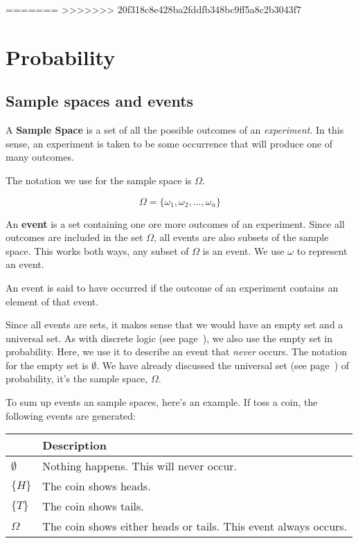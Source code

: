 =======
>>>>>>> 20f318c8e428ba2fddfb348bc9ff5a8c2b3043f7
\section{Probability}



\subsection{Sample spaces and events}

A {\bf Sample Space} is a set of all the possible outcomes of an {\it
experiment}. In this sense, an experiment is taken to be some occurrence that
will produce one of many outcomes.

The notation we use for the sample space is $\Omega$.

\begin{dmath*}
	\Omega = \{\omega_1, \omega_2, \ldots, \omega_n\}
\end{dmath*}

An {\bf event} is a set containing one ore more outcomes of an experiment. Since
all outcomes are included in the set $\Omega$, all events are also subsets of
the sample space. This works both ways, any subset of $\Omega$ is an event. We
use $\omega$ to represent an event.

An event is said to have occurred if the outcome of an experiment contains an
element of that event.

Since all events are sets, it makes sense that we would have an empty set and a
universal set. As with discrete logic (see page~\pageref{subsubsec:empty_set}),
we also use the empty set in probability. Here, we use it to describe an event
that {\it never} occurs. The notation for the empty set is $\emptyset$. We have
already discussed the universal set (see page~\pageref{subsubsec:universal_set})
of probability, it's the sample space, $\Omega$.


To sum up events an sample spaces, here's an example. If toss a coin, the
following events are generated:

\begin{center}
	\begin{tabular}{|>{\centering\arraybackslash}m{1cm}|m{8cm}|}
		\hline
		{\bf Event} & {\bf Description}\\ \hline
		$\emptyset$ & Nothing happens. This will never occur.\\ \hline
		$\{H\}$     & The coin shows heads.\\ \hline
		$\{T\}$     & The coin shows tails.\\ \hline
		$\Omega$    & The coin shows either heads or tails. This event always occurs.\\
		\hline
	\end{tabular}
\end{center}


